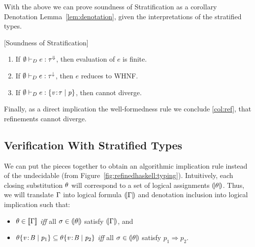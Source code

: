 With the above we can prove soundness of Stratification as a corollary 
Denotation Lemma~\ref{lem:denotation}, given the interpretations of 
the stratified types. 
%
\begin{corollary}{[Soundness of Stratification]}\label{cor:stratification} 
\begin{enumerate}
  \item If $\emptyset \vdash_D e:{\tau}^{\Downarrow}$, then  evaluation of $e$ is finite.
  \item If $\emptyset \vdash_D e:{\tau}^{\downarrow}$, then  $e$ reduces to WHNF.
  \item\label{col:ref} If $\emptyset \vdash_D e:\{ {\mathit{v}\!:\!\tau} \mid \mathit{p} \}$, then \p cannot diverge.
\end{enumerate}
\end{corollary}

Finally, as a direct implication the well-formedness rule \rwbased 
we conclude \ref{col:ref}, \ie that refinements cannot diverge.

\subsection{Verification With Stratified Types}\label{sec:typing:vc}

We can put the pieces together to obtain an algorithmic implication 
rule \rtdimp instead of the undecidable \rimpl (from Figure~\ref{fig:refinedhaskell:typing}).
%
Intuitively, each closing substitution $\theta$ will correspond to 
a set of logical assignments $(\!|\theta|\!)$. 
%
Thus, we will translate $\Gamma$ into logical
formula $(\!|\Gamma|\!)$ and 
denotation inclusion into logical implication 
such that:
%
\begin{itemize}
\item $\theta \in [\![\Gamma]\!]$ \textit{iff} all $\sigma \in (\!|\theta|\!)$ 
     satisfy $(\!|\Gamma|\!)$, and 
\item ${\theta}{\{ {\mathit{v}\!:\!\mathit{B}} \mid \mathit{p}_1 \}}\subseteq {\ensuremath{\theta}}{\ensuremath{\{ {\mathit{v}\!:\!\mathit{B}} \mid \mathit{p}_2 \}}}$ 
		\textit{iff} all $\sigma \in (\!|\theta|\!)$ satisfy $p_1 \Rightarrow p_2$.
\end{itemize} 


